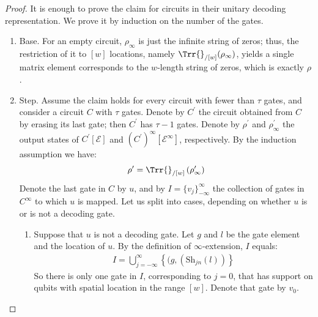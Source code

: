 \begin{proof}
  It is enough to prove the claim for circuits in their unitary decoding representation. We prove it by induction on the number of the gates.

  \begin{enumerate}
    \item Base. For an empty circuit, $\rho_{\infty}$ is just the infinite string of zeros; thus, the restriction of it to $[w]$ locations, namely $ \Trr{}_{/[w]}( \rho_{\infty} ) $, yields a single matrix element corresponds to the $w$-length string of zeros, which is exactly $\rho$.
    \item Step. Assume the claim holds for every circuit with fewer than $\tau$ gates, and consider a circuit $C$ with $\tau$ gates. Denote by $C^{\prime}$ the circuit obtained from $C$ by erasing its last gate; then $C^{\prime}$ has $\tau-1$ gates. Denote by $\rho^{\prime}$ and $\rho_{\infty}^{\prime}$ the output states of $C^{\prime}[\mathcal{E}]$ and $(C^{\prime})^{\infty}[\mathcal{E}^{\infty}]$, respectively.
      By the induction assumption we have:
  \begin{equation*}
    \begin{split}
      \rho^{\prime} =  \Trr{}_{/[w]}\left( \rho^{\prime}_{\infty} \right) 
    \end{split}
  \end{equation*}
Denote the last gate in $C$ by $u$, and by $I = \{v_{j}\}_{-\infty}^{\infty}$ the collection of gates in $C^{\infty}$ to which $u$ is mapped. Let us split into cases, depending on whether $u$ is or is not a decoding gate.
  \begin{enumerate}
    \item Suppose that $u$ is not a decoding gate. Let $g$ and $l$ be the gate element and the location of $u$. By the definition of $\infty$-extension, $I$ equals:
      \begin{equation*}
        \begin{split}
              I = \bigcup_{j = -\infty}^{\infty}\left\{ (g,( \text{Sh}_{jn}(l)) \right\}
        \end{split}
      \end{equation*}
      So there is only one gate in $I$, corresponding to $j=0$, that has support on qubits with spatial location in the range $[w]$. Denote that gate by $v_{0}$. 


\end{enumerate}
\end{enumerate}
\end{proof}
